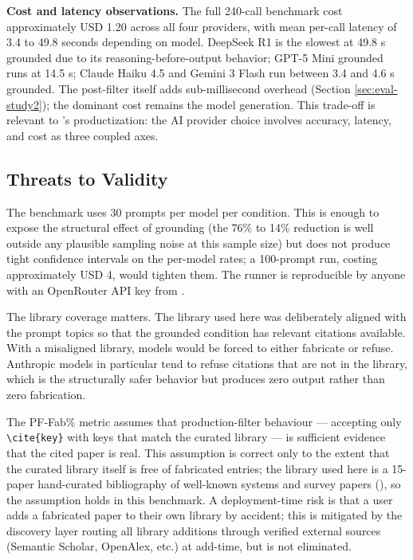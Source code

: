 \textbf{Cost and latency observations.} The full 240-call benchmark cost approximately USD 1.20 across all four providers, with mean per-call latency of 3.4 to 49.8 seconds depending on model. DeepSeek R1 is the slowest at 49.8 s grounded due to its reasoning-before-output behavior; GPT-5 Mini grounded runs at 14.5 s; Claude Haiku 4.5 and Gemini 3 Flash run between 3.4 and 4.6 s grounded. The post-filter itself adds sub-millisecond overhead (Section \ref{sec:eval-study2}); the dominant cost remains the model generation. This trade-off is relevant to \sh{}'s productization: the AI provider choice involves accuracy, latency, and cost as three coupled axes.

\subsection{Threats to Validity}

The benchmark uses 30 prompts per model per condition. This is enough to expose the structural effect of grounding (the 76\% to 14\% reduction is well outside any plausible sampling noise at this sample size) but does not produce tight confidence intervals on the per-model rates; a 100-prompt run, costing approximately USD 4, would tighten them. The runner is reproducible by anyone with an OpenRouter API key from .

The library coverage matters. The library used here was deliberately aligned with the prompt topics so that the grounded condition has relevant citations available. With a misaligned library, models would be forced to either fabricate or refuse. Anthropic models in particular tend to refuse citations that are not in the library, which is the structurally safer behavior but produces zero output rather than zero fabrication.

The PF-Fab\% metric assumes that production-filter behaviour --- accepting only \texttt{\textbackslash cite\{key\}} with keys that match the curated library --- is sufficient evidence that the cited paper is real. This assumption is correct only to the extent that the curated library itself is free of fabricated entries; the library used here is a 15-paper hand-curated bibliography of well-known systems and survey papers (), so the assumption holds in this benchmark. A deployment-time risk is that a user adds a fabricated paper to their own library by accident; this is mitigated by the discovery layer routing all library additions through verified external sources (Semantic Scholar, OpenAlex, etc.) at add-time, but is not eliminated.

